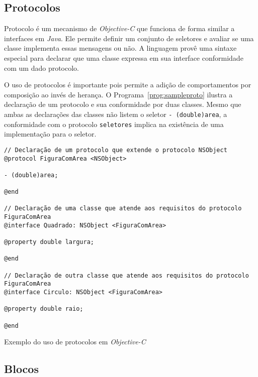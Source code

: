 \subsection{Protocolos}
\label{sec:protocol}

Protocolo é um mecanismo de \emph{Objective-C} que funciona de forma similar a interfaces em \emph{Java}.
Ele permite definir um conjunto de seletores e avaliar se uma classe implementa essas mensagens ou não.
A linguagem provê uma sintaxe especial para declarar que uma classe expressa em sua
interface conformidade com um dado protocolo.

O uso de protocolos é importante pois permite a adição de comportamentos por composição ao invés de herança.
O Programa~\ref{prog:sampleproto} ilustra a declaração de um protocolo e sua conformidade por duas classes.
Mesmo que ambas as declarações das classes não listem o seletor \texttt{- (double)area}, a conformidade
com o protocolo \texttt{seletores} implica na existência de uma implementação para o seletor.

\begin{program}
  \centering

\lstset{language=[Objective]C}
\begin{lstlisting}[style=wider]
// Declaração de um protocolo que extende o protocolo NSObject
@protocol FiguraComArea <NSObject>

- (double)area;

@end

// Declaração de uma classe que atende aos requisitos do protocolo FiguraComArea
@interface Quadrado: NSObject <FiguraComArea>

@property double largura;

@end

// Declaração de outra classe que atende aos requisitos do protocolo FiguraComArea
@interface Circulo: NSObject <FiguraComArea>

@property double raio;

@end

\end{lstlisting}

  \caption{Exemplo do uso de protocolos em \emph{Objective-C}\label{prog:sampleproto}}
\end{program}

\subsection{Blocos}
\label{sec:blocks}

